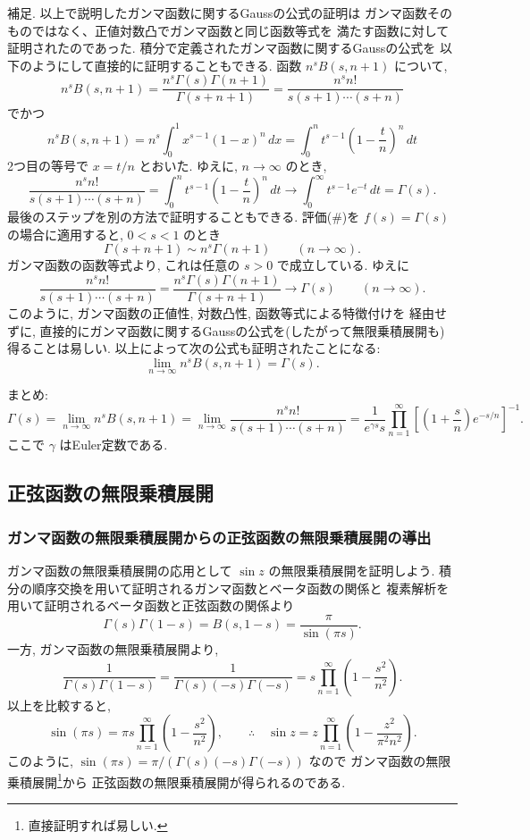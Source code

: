 \documentclass[12pt,twoside]{jarticle}
\theoremstyle{jplain}
\theoremstyle{jplain}
\theoremstyle{jplain}
\numberwithin{theorem}{section}
\numberwithin{equation}{section}
\numberwithin{figure}{section}
\numberwithin{table}{section}
\begin{document}
補足. 以上で説明したガンマ函数に関するGaussの公式の証明は
ガンマ函数そのものではなく、正値対数凸でガンマ函数と同じ函数等式を
満たす函数に対して証明されたのであった.
積分で定義されたガンマ函数に関するGaussの公式を
以下のようにして直接的に証明することもできる.
函数 $n^s B(s,n+1)$ について,
\[
n^sB(s,n+1)
=\frac{n^s\Gamma(s)\Gamma(n+1)}{\Gamma(s+n+1)}
=\frac{n^s n!}{s(s+1)\cdots(s+n)}
\]
でかつ
\[
n^sB(s,n+1)
=n^s\int_0^1 x^{s-1}(1-x)^n\,dx
=\int_0^n t^{s-1}\left(1-\frac{t}{n}\right)^n\,dt
\]
2つ目の等号で $x=t/n$ とおいた. ゆえに, $n\to\infty$ のとき,
\[
\frac{n^s n!}{s(s+1)\cdots(s+n)}
=\int_0^n t^{s-1}\left(1-\frac{t}{n}\right)^n\,dt
\longrightarrow
\int_0^\infty t^{s-1}e^{-t}\,dt
=\Gamma(s).
\]
最後のステップを別の方法で証明することもできる.
評価($\#$)を $f(s)=\Gamma(s)$ の場合に適用すると,
$0<s<1$ のとき
\[
\Gamma(s+n+1)\sim n^s\Gamma(n+1)
\qquad(n\to\infty).
\]
ガンマ函数の函数等式より, これは任意の $s>0$ で成立している. ゆえに
\[
\frac{n^s n!}{s(s+1)\cdots(s+n)}
=\frac{n^s\Gamma(s)\Gamma(n+1)}{\Gamma(s+n+1)}
\longrightarrow
\Gamma(s)
\qquad(n\to\infty).
\]
このように, ガンマ函数の正値性, 対数凸性, 函数等式による特徴付けを
経由せずに, 直接的にガンマ函数に関するGaussの公式を(したがって無限乗積展開も)
得ることは易しい.  以上によって次の公式も証明されたことになる:
\[
\lim_{n\to\infty}n^s B(s,n+1)=\Gamma(s).
\]

まとめ:
\[
\Gamma(s)
=\lim_{n\to\infty}n^sB(s,n+1)
=\lim_{n\to\infty}\frac{n^s n!}{s(s+1)\cdots(s+n)}
=\frac{1}{e^{\gamma s}s}\prod_{n=1}^\infty\left[\left(1+\frac{s}{n}\right)e^{-s/n}\right]^{-1}.
\]
ここで $\gamma$ はEuler定数である.



\subsection{正弦函数の無限乗積展開}
\label{sub:prod-sin}

\subsubsection{ガンマ函数の無限乗積展開からの正弦函数の無限乗積展開の導出}
\label{sub:prod-sin0}

ガンマ函数の無限乗積展開の応用として $\sin z$ の無限乗積展開を証明しよう.
積分の順序交換を用いて証明されるガンマ函数とベータ函数の関係と
複素解析を用いて証明されるベータ函数と正弦函数の関係より
\[
\Gamma(s)\Gamma(1-s)=B(s,1-s)=\frac{\pi}{\sin(\pi s)}.
\]
一方, ガンマ函数の無限乗積展開より,
\[
\frac{1}{\Gamma(s)\Gamma(1-s)}
=\frac{1}{\Gamma(s)(-s)\Gamma(-s)}
=s\prod_{n=1}^\infty\left(1-\frac{s^2}{n^2}\right).
\]
以上を比較すると,
\[
\sin(\pi s)=\pi s\prod_{n=1}^\infty\left(1-\frac{s^2}{n^2}\right),
\qquad\therefore\quad
\sin z=z\prod_{n=1}^\infty\left(1-\frac{z^2}{\pi^2n^2}\right).
\]
このように, $\sin(\pi s)=\pi/(\Gamma(s)(-s)\Gamma(-s))$ なので
ガンマ函数の無限乗積展開\footnote{直接証明すれば易しい.}から
正弦函数の無限乗積展開が得られるのである.
\end{document}
